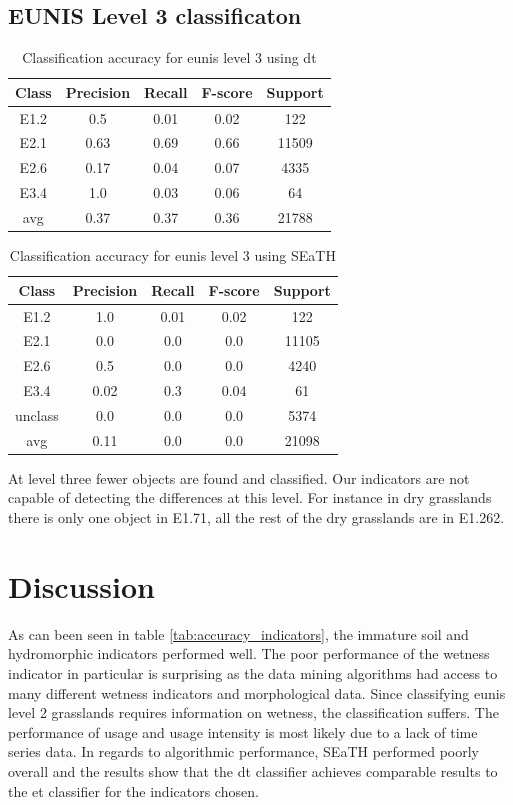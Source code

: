 \documentclass[authoryear,final,12pt,number]{elsarticle}
\begin{document}
\subsection{EUNIS Level 3 classificaton}
\begin{table}
\centering
\begin{tabular}{c c c c c}
Class & Precision & Recall & F-score & Support\\
\hline
E1.2 & 0.5 & 0.01 & 0.02 & 122\\
E2.1 & 0.63 & 0.69 & 0.66 & 11509\\
E2.6 & 0.17 & 0.04 & 0.07 & 4335\\
E3.4 & 1.0 & 0.03 & 0.06 & 64\\
avg & 0.37 & 0.37 & 0.36 & 21788\\
\end{tabular}
\caption{Classification accuracy for \gls{eunis} level 3 using \gls{dt}}
\end{table}
\begin{table}
\centering
\begin{tabular}{c c c c c}
Class & Precision & Recall & F-score & Support\\
\hline
E1.2 & 1.0 & 0.01 & 0.02 & 122\\
E2.1 & 0.0 & 0.0 & 0.0 & 11105\\
E2.6 & 0.5 & 0.0 & 0.0 & 4240\\
E3.4 & 0.02 & 0.3 & 0.04 & 61\\
unclass & 0.0 & 0.0 & 0.0 & 5374\\
avg & 0.11 & 0.0 & 0.0 & 21098\\
\end{tabular}
\caption{Classification accuracy for \gls{eunis} level 3 using SEaTH}
\end{table}
At level three fewer objects are found and classified. Our indicators are not 
capable of detecting the differences at this level. For instance in dry 
grasslands there is only one object in E1.71, all the rest of the dry 
grasslands are in E1.262.

\section{Discussion}
As can been seen in table \ref{tab:accuracy_indicators}, the immature soil and
hydromorphic indicators performed well. The poor performance of the wetness
indicator in particular is surprising as the data mining algorithms had 
access to many different wetness indicators and morphological data. Since 
classifying \gls{eunis} level 2 grasslands requires information on wetness, 
the classification suffers. The performance of usage and usage intensity is 
most likely due to a lack of time series data. In regards to algorithmic 
performance, SEaTH performed poorly overall and the results show that the 
\gls{dt} classifier achieves comparable results to the \gls{et} classifier 
for the indicators chosen. 
\end{document}
